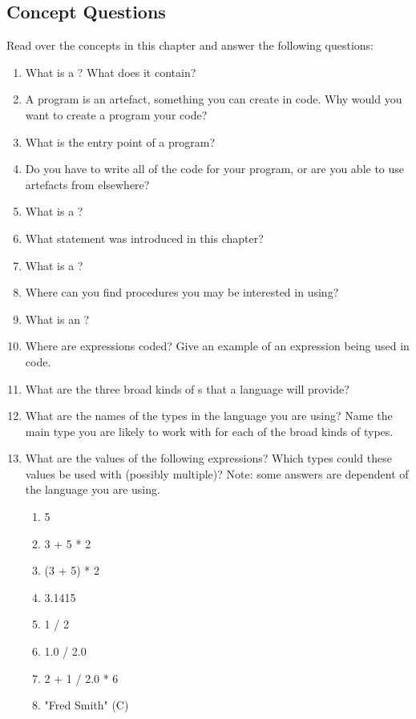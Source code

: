 \subsection{Concept Questions} %
\label{sub:concept_questions_prog}

Read over the concepts in this chapter and answer the following questions:
\begin{enumerate}
  \item What is a ? What does it contain?
  \item A program is an artefact, something you can create in code. Why would you want to create a program your code?
  \item What is the entry point of a program?
  \item Do you have to write all of the code for your program, or are you able to use artefacts from elsewhere?
  \item What is a ?
  \item What statement was introduced in this chapter?
  \item What is a ?
  \item Where can you find procedures you may be interested in using?
  \item What is an ?
  \item Where are expressions coded? Give an example of an expression being used in code.
  \item What are the three broad kinds of s that a language will provide?
  \item What are the names of the types in the language you are using? Name the main type you are likely to work with for each of the broad kinds of types.
  \item What are the values of the following expressions? Which types could these values be used with (possibly multiple)? Note: some answers are dependent of the language you are using.
  \begin{multicols}{3}
  \begin{enumerate}
    \item 5
    \item 3 + 5 * 2
    \item (3 + 5) * 2
    \item 3.1415
    \item 1 / 2 
    \item 1.0 / 2.0
    \item 2 + 1 / 2.0 * 6
    \item "Fred Smith" (C)

\end{enumerate}
\end{multicols}
\end{enumerate}
